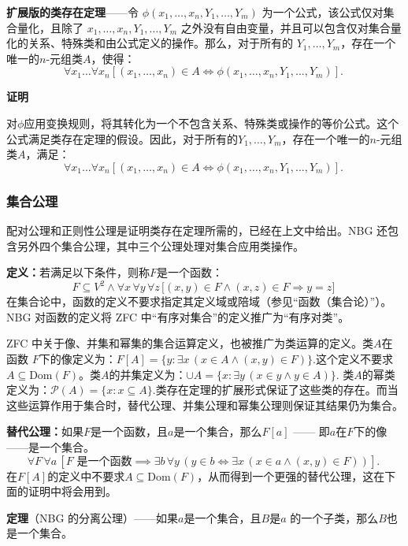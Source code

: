 \textbf{扩展版的类存在定理}——令 \( \phi (x_1, \dots ,x_n, Y_1, \dots ,Y_m) \) 为一个公式，该公式仅对集合量化，且除了 \( x_1, \dots , x_n, Y_1, \dots , Y_m \) 之外没有自由变量，并且可以包含仅对集合量化的关系、特殊类和由公式定义的操作。那么，对于所有的 \( Y_1, \dots , Y_m \)，存在一个唯一的\( n \)-元组类\( A \)，使得：
\[
\forall x_1 \dots \forall x_n \left[ (x_1, \dots , x_n) \in A \iff \phi (x_1, \dots , x_n, Y_1, \dots , Y_m) \right].~
\]

\textbf{证明}  

对\( \phi \)应用变换规则，将其转化为一个不包含关系、特殊类或操作的等价公式。这个公式满足类存在定理的假设。因此，对于所有的\( Y_1, \dots , Y_m \)，存在一个唯一的\( n \)-元组类\( A \)，满足：
\[
\forall x_1 \dots \forall x_n \left[ (x_1, \dots , x_n) \in A \iff \phi (x_1, \dots , x_n, Y_1, \dots , Y_m) \right].~
\]
\subsubsection{集合公理}  
配对公理和正则性公理是证明类存在定理所需的，已经在上文中给出。NBG 还包含另外四个集合公理，其中三个公理处理对集合应用类操作。

\textbf{定义：}若满足以下条件，则称\(F\)是一个函数：
\[
F \subseteq V^2 \land \forall x\, \forall y\, \forall z\, \big[(x, y) \in F \land (x, z) \in F \Rightarrow y = z\big]~
\]
在集合论中，函数的定义不要求指定其定义域或陪域（参见“函数（集合论）”）。NBG 对函数的定义将 ZFC 中“有序对集合”的定义推广为“有序对类”。

ZFC 中关于像、并集和幂集的集合运算定义，也被推广为类运算的定义。类\( A \)在函数 \( F \)下的像定义为：\(F[A] = \{ y : \exists x\, (x \in A \land (x, y) \in F) \}\).这个定义不要求\( A \subseteq \mathrm{Dom}(F) \)。类\( A \)的并集定义为：\(\cup A = \{ x : \exists y\, (x \in y \land y \in A) \}\).
类\( A \)的幂类定义为：\(\mathcal{P}(A) = \{ x : x \subseteq A \}\).类存在定理的扩展形式保证了这些类的存在。而当这些运算作用于集合时，替代公理、并集公理和幂集公理则保证其结果仍为集合。

\textbf{替代公理：}如果\( F \)是一个函数，且\( a \)是一个集合，那么\( F[a] \) —— 即\( a \)在\( F \)下的像——是一个集合。
\[
\forall F \, \forall a \, [F \text{ 是一个函数} \implies \exists b \, \forall y \, (y \in b \iff \exists x \, (x \in a \land (x, y) \in F))].~
\]
在\( F[A] \)的定义中不要求\( A \subseteq \mathrm{Dom}(F) \)，从而得到一个更强的替代公理，这在下面的证明中将会用到。

\textbf{定理}（NBG 的分离公理）——如果\( a \)是一个集合，且\( B \)是\( a \) 的一个子类，那么\( B \)也是一个集合。

